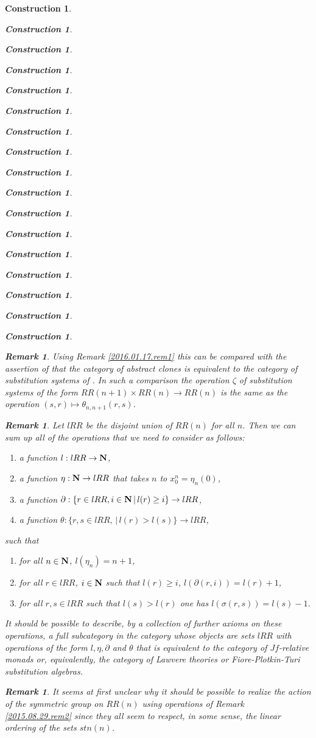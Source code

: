 \documentclass[12pt]{amsart}
\newtheorem{remark}[proposition]{Remark}
\newtheorem{construction}[proposition]{Construction}
\newcommand{\llabel}[1]{\label{#1}}
\newcommand{\sr}{\rightarrow}
\newcommand{\nn}{{\bf N\rm}}
\newcommand{\nat}{\nn}
\begin{document}
\begin{construction}
\begin{construction}
\begin{construction}
\begin{construction}
\begin{construction}
\begin{construction}
\begin{construction}
\begin{construction}
\begin{construction}
\begin{construction}
\begin{construction}
\begin{construction}
\begin{construction}
\begin{construction}
\begin{construction}
\begin{construction}
\begin{construction}
\begin{remark}
Using Remark \ref{2016.01.17.rem1} this can be compared with the assertion of
\cite[Theorem 3.3]{FPT} that the category of abstract clones is equivalent to
the category of substitution systems of \cite[Definition 3.1]{FPT}. In such a
comparison the operation $\zeta$ of substitution systems of the form
$RR(n+1)\times RR(n)\sr RR(n)$ is the same as the operation $(s,r)\mapsto
\theta_{n,n+1}(r,s)$.
\end{remark}
%
\begin{remark}\rm
\llabel{2015.08.29.rem1}
Let $lRR$ be the disjoint union of $RR(n)$ for all $n$. Then we can sum up all of the operations that we need to consider as follows: 
%
\begin{enumerate}
\item a function $l:lRR\sr\nat$,
\item a function $\eta:\nat\sr lRR$ that takes $n$ to $x^n_0=\eta_{n}(0)$,
\item a function $\partial:\{r\in lRR, i\in\nat\,|\, l(r)\ge i\}\sr lRR$,
\item a function $\theta:\{r,s\in lRR,\,|\,l(r)>l(s)\}\sr lRR$,
\end{enumerate}
%
such that
%
\begin{enumerate}
\item for all $n\in\nat$, $l(\eta_{n})=n+1$,
\item for all $r\in lRR$, $i\in\nat $ such that $l(r)\ge i$, $l(\partial(r,i))=l(r)+1$,
\item for all $r,s\in lRR$ such that $l(s)>l(r)$ one has $l(\sigma(r,s))=l(s)-1$.
\end{enumerate}
%
It should be possible to describe, by a collection of further axioms on these
operations, a full subcategory in the category whose objects are sets $lRR$
with operations of the form $l,\eta,\partial$ and $\theta$ that is equivalent
to the category of $Jf$-relative monads or, equivalently, the category of
Lawvere theories or Fiore-Plotkin-Turi substitution algebras.
\end{remark}
%
\begin{remark}\rm
\llabel{2015.08.29.rem1b} It seems at first unclear why it should be possible
to realize the action of the symmetric group on $RR(n)$ using operations of
Remark \ref{2015.08.29.rem2} since they all seem to respect, in some sense, the
linear ordering of the sets $stn(n)$.


\end{remark}
\end{construction}
\end{construction}
\end{construction}
\end{construction}
\end{construction}
\end{construction}
\end{construction}
\end{construction}
\end{construction}
\end{construction}
\end{construction}
\end{construction}
\end{construction}
\end{construction}
\end{construction}
\end{construction}
\end{construction}
\end{document}
